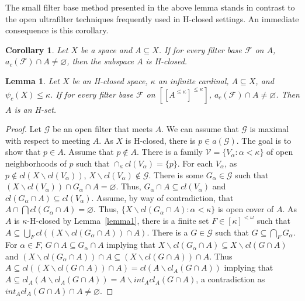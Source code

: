 \documentclass[11pt]{amsart}
\newif\ifdraft\draftfalse
\newtheorem{lemma}[theorem]{Lemma}
\newtheorem{corollary}[theorem]{Corollary}
\theoremstyle{definition}
\theoremstyle{remark}
\numberwithin{equation}{section}
\begin{document}
The small filter base method presented in the above lemma stands in contrast to the open ultrafilter techniques frequently used in H-closed settings. 
An immediate consequence is this corollary.

\begin{corollary} Let $X$ be a space and $A {\subseteq} X$.  If for every filter base ${\ensuremath{\mathcal{F}}}$ on $A$, $a_c({\ensuremath{\mathcal{F}}}) \cap A  \ne \varnothing$, then the subspace  $A$ is H-closed.
\end{corollary}

\begin{lemma}{{\immediate{}}{\ifdraft\hspace{-\lastskip}\vadjust{\vspace{-1mm}\smash{\llap{{\tt {{lemma2}}}\hspace{8mm}}}\vspace{1mm}}\fi}}
Let $X$ be an H-closed space, ${\kappa}$ an infinite cardinal, $A{\subseteq} X$, and $\psi_c(X) \leq \kappa$.  If  for every filter base ${\ensuremath{\mathcal{F}}}$ on $[[A^{\leq \kappa}]^{\leq \kappa}]$, $a_c({\ensuremath{\mathcal{F}}}) \cap A  \ne \varnothing$.  Then $A$ is an H-set.
\end{lemma}
\begin{proof}
Let ${\ensuremath{\mathcal{G}}}$ be an open filter that meets $A$.  We can assume that ${\ensuremath{\mathcal{G}}}$ is maximal with respect to meeting $A$.  As $X$ is H-closed, there is $p \in a({\ensuremath{\mathcal{G}}})$.  The goal is to show that $p \in A$.  Assume that $p \not\in A$. There is a family ${\ensuremath{\mathcal{V}}} = \{V_{\alpha}: \alpha < \kappa \}$ of open neighborhoods of $p$ such that $\cap_{\kappa}cl(V_{\alpha}) = \{p\}$. For each $V_{\alpha}$, as $p \not\in cl(X\backslash cl(V_{\alpha}))$, $X\backslash cl(V_{\alpha}) \not\in {\ensuremath{\mathcal{G}}}$.  There is some $G_{\alpha} \in {\ensuremath{\mathcal{G}}}$ such that $(X\backslash cl(V_{\alpha})) \cap G_{\alpha} \cap A = \varnothing$.  Thus, $G_{\alpha} \cap A {\subseteq} cl(V_{\alpha})$ and $cl(G_{\alpha} \cap A) {\subseteq} cl(V_{\alpha})$.  Assume, by way of contradiction, that $A \cap \bigcap cl(G_{\alpha} \cap A) = \varnothing.$  Thus, $\{X\backslash cl(G_{\alpha} \cap A): {\alpha} < {\kappa}\}$ is open cover of $A$.  As $A$ is $\kappa$-H-closed by Lemma~\ref{lemma1}, there is a finite set $F \in [{\kappa}]^{<\omega}$ such that $A \subseteq \bigcup_Fcl((X\backslash cl(G_{\alpha} \cap A))\cap A)$.  There is a $G \in {\ensuremath{\mathcal{G}}}$ such that $G {\subseteq} \bigcap_FG_{\alpha}$.  For ${\alpha} \in F$, $G \cap A {\subseteq} G_{\alpha}\cap A$ implying that $X\backslash cl(G_{\alpha}\cap A) {\subseteq} X\backslash cl(G \cap A )$ and  $(X\backslash cl(G_{\alpha}\cap A))\cap A {\subseteq} (X\backslash cl(G \cap A ))\cap A$.
Thus $A {\subseteq} cl((X\backslash cl(G \cap A))\cap A) = cl(A\backslash cl_A(G\cap A))$ implying that $A {\subseteq}  cl_A(A\backslash cl_A(G\cap A)) = A\backslash int_Acl_A(G\cap A) $,  a contradiction as $int_Acl_A(G\cap A)\cap A \ne \varnothing$.
\end{proof}
\end{document}
